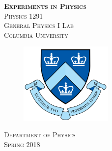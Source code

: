 \begin{titlepage}
\begin{center}
\textsc{\Huge\bf Experiments in Physics}
\\[5cm]
\textsc{\huge Physics 1291}
\\[0.3cm]
\textsc{\huge General Physics I Lab}
\\[4cm]
\textsc{\large Columbia University}
\\[0.5cm]
\begin{figure}[h]
  \centering
  \includegraphics[height=4cm]{./pic/Columbia-Logo.png}
\end{figure}
\textsc{Department of Physics}
\\[1cm]
\textsc{Spring 2018}
\end{center}
\end{titlepage}
